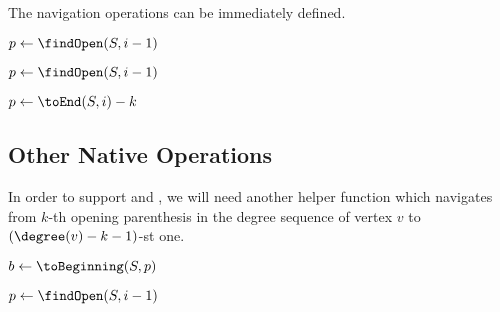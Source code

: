The navigation operations can be immediately defined.

\begin{algorithmic}
	\State $p \gets \findOpen(S, i - 1)$ 
	\State {}
\EndFunction
\end{algorithmic}

\begin{algorithmic}
	\State {}
\EndFunction
\end{algorithmic}

\begin{algorithmic}
	\State $p \gets \findOpen(S, i - 1)$
	\State {}
\EndFunction
\end{algorithmic}

\begin{algorithmic}
	\State $p \gets \toEnd(S, i) - k$
	\State {}
\EndFunction
\end{algorithmic}

\subsection{Other Native Operations}

\begin{algorithmic}
	\State {}
\EndFunction
\end{algorithmic}

\begin{algorithmic}
	\State {}
\EndFunction
\end{algorithmic}

In order to support \dfudsRank{} and \dfudsSelect{}, we will need another helper function \toSymetric{} which navigates from $k$-th opening parenthesis in the degree sequence of vertex $v$ to $(\degree(v) - k - 1)$-st one.

\begin{algorithmic}
	\State $b \gets \toBeginning(S, p)$
	\State {}
\EndFunction
\end{algorithmic}

\begin{algorithmic}
		\State {}
	\Else
		\State $p \gets \findOpen(S, i - 1)$
		\State {}
	\EndIf
\EndFunction
\end{algorithmic}


